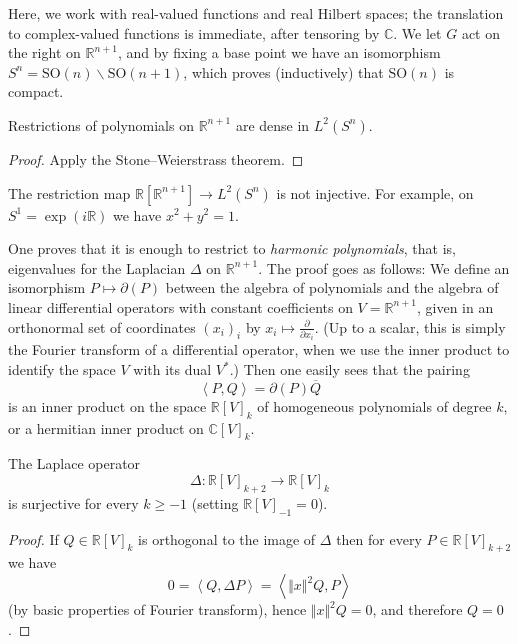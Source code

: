 Here, we work with real-valued functions and real Hilbert spaces; the translation to complex-valued functions is immediate, after tensoring by $\mathbb C$. We let $G$ act on the right on $\mathbb R^{n+1}$, and by fixing a base point we have an isomorphism $S^n = \text{SO}(n)\backslash \text{SO}(n+1)$, which proves (inductively) that $\text{SO}(n)$ is compact.

\begin{lemma}
 \label{lemma-polynomials-dense-onsphere}
Restrictions of polynomials on $\mathbb R^{n+1}$ are dense in $L^2(S^n)$. 
\end{lemma}

\begin{proof}
 Apply the Stone--Weierstrass theorem.
\end{proof}

The restriction map $\mathbb R[\mathbb R^{n+1}] \to L^2(S^n)$ is not injective. For example, on $S^1 = \exp(i\mathbb R)$ we have $x^2 + y^2 = 1$. 

One proves that it is enough to restrict to \emph{harmonic polynomials}, that is, eigenvalues for the Laplacian $\Delta$ on $\mathbb R^{n+1}$. The proof goes as follows: We define an isomorphism $P\mapsto \partial (P)$ between the algebra of polynomials and the algebra of linear differential operators with constant coefficients on $V = \mathbb R^{n+1}$, given in an orthonormal set of coordinates $(x_i)_i$ by $x_i\mapsto \frac{\partial}{\partial x_i}$. (Up to a scalar, this is simply the Fourier transform of a differential operator, when we use the inner product to identify the space $V$ with its dual $V^*$.) Then one easily sees that the pairing 
\begin{equation}
 \label{equation-pairing-homogeneous}
 \left< P , Q\right> = \partial(P) \overline{Q}
\end{equation}
is an inner product on the space $\mathbb R[V]_k$ of homogeneous polynomials of degree $k$, or a hermitian inner product on $\mathbb C[V]_k$.


\begin{lemma}
 \label{lemma-Laplacian-onto}
The Laplace operator
$$ \Delta:\mathbb R[V]_{k+2}  \to \mathbb R[V]_k$$
is surjective for every $k\ge -1$ (setting $\mathbb R[V]_{-1} =0$).  
\end{lemma}

\begin{proof}
 If $Q\in \mathbb R[V]_k$ is orthogonal to the image of $\Delta$ then for every $P\in \mathbb R[V]_{k+2}$ we have
 $$ 0 = \left < Q, \Delta P \right> = \left< \Vert x\Vert^2 Q, P\right>$$
 (by basic properties of Fourier transform),
 hence $\Vert x \Vert^2 Q = 0$, and therefore $Q=0$.
\end{proof} 
 
